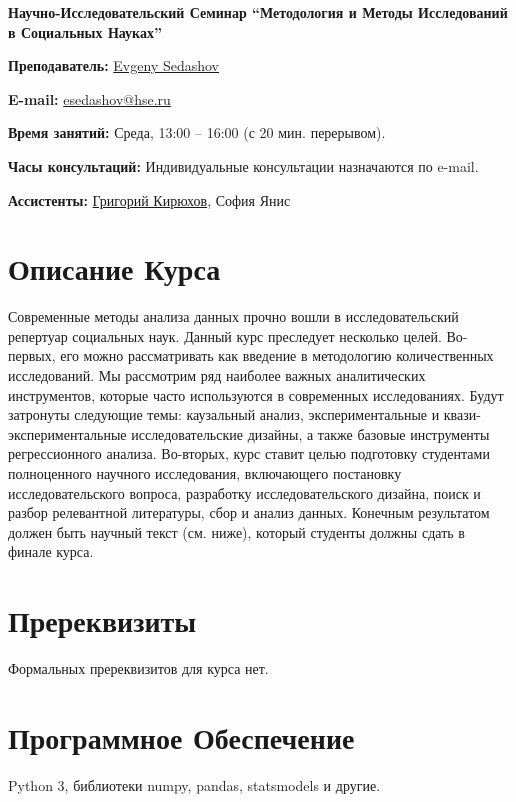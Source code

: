 \documentclass[12pt]{article}
\begin{document}
\begin{center}
\huge \textbf{Научно-Исследовательский Семинар  ``Методология и Методы Исследований в Социальных Науках''}
\end{center}
\vspace{5 mm}

\textbf{Преподаватель:} \href{https://www.hse.ru/staff/sedashov}{Evgeny Sedashov} 
\vspace{2 mm}

\textbf{E-mail:} \href{mailto:esedashov@hse.ru}{esedashov@hse.ru}
\vspace{2 mm}

\textbf{Время занятий:} Среда, 13:00 -- 16:00 (с 20 мин. перерывом). 
\vspace{2 mm}

\textbf{Часы консультаций:} Индивидуальные консультации назначаются по e-mail. 
\vspace{2 mm}

\textbf{Ассистенты:} \href{https://www.hse.ru/staff/KirilHSE/}{Григорий Кирюхов}, София Янис
\vspace{2 mm}


\section*{Описание Курса} 
Современные методы анализа данных прочно вошли в исследовательский репертуар социальных наук. Данный курс преследует несколько целей. Во-первых, его можно рассматривать как введение в методологию количественных исследований. Мы рассмотрим ряд наиболее важных аналитических инструментов, которые часто используются в современных исследованиях. Будут затронуты следующие темы: каузальный анализ, экспериментальные и квази-экспериментальные исследовательские дизайны, а также базовые инструменты регрессионного анализа. Во-вторых, курс ставит целью подготовку студентами полноценного научного исследования, включающего постановку исследовательского вопроса, разработку исследовательского дизайна, поиск и разбор релевантной литературы, сбор и анализ данных. Конечным результатом должен быть научный текст (см. ниже), который студенты должны сдать в финале курса.  
\section*{Пререквизиты} 
Формальных пререквизитов для курса нет. 
\section*{Программное Обеспечение} 
Python 3,  библиотеки numpy,  pandas,  statsmodels и другие. 
\end{document}
